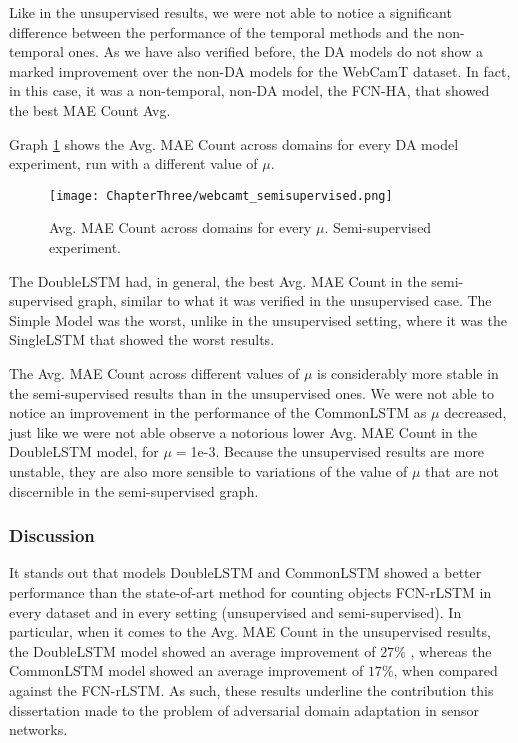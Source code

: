 Like in the unsupervised results, we were not able to notice a significant difference between the performance of the temporal methods and the non-temporal ones. As we have also verified before, the DA models do not show a marked improvement over the non-DA models for the WebCamT dataset. In fact, in this case, it was a non-temporal, non-DA model, the FCN-HA, that showed the best MAE Count Avg.

Graph \ref{fig:webcamt_semi-supervised_graph} shows the Avg. MAE Count across domains for every DA model experiment, run with a different value of $\mu$.

\begin{figure}[!ht]
	\centering
	\texttt{[image: ChapterThree/webcamt\_semisupervised.png]}   
	\caption{Avg. MAE Count across domains for every $\mu$. Semi-supervised experiment.}
	\label{fig:webcamt_semi-supervised_graph}
\end{figure}

The DoubleLSTM had, in general, the best Avg. MAE Count in the semi-supervised graph, similar to what it was verified in the unsupervised case. The Simple Model was the worst, unlike in the unsupervised setting, where it was the SingleLSTM that showed the worst results.

The Avg. MAE Count across different values of $\mu$ is considerably more stable in the semi-supervised results than in the unsupervised ones. We were not able to notice an improvement in the performance of the CommonLSTM as $\mu$ decreased, just like we were not able observe a notorious lower Avg. MAE Count in the DoubleLSTM model, for $\mu=$1e-3. Because the unsupervised results are more unstable, they are also more sensible  to variations of the value of $\mu$ that are not discernible in the semi-supervised graph.

\subsubsection{Discussion}

It stands out that models DoubleLSTM and CommonLSTM showed a better performance than the state-of-art method for counting objects FCN-rLSTM in every dataset and in every setting (unsupervised and semi-supervised). In particular, when it comes to the Avg. MAE Count in the unsupervised results, the DoubleLSTM model showed an average improvement of $27\%$ , whereas the CommonLSTM model showed an average improvement of $17\%$, when compared against the FCN-rLSTM. As such, these results underline the contribution this dissertation made to the problem of adversarial domain adaptation in sensor networks.

